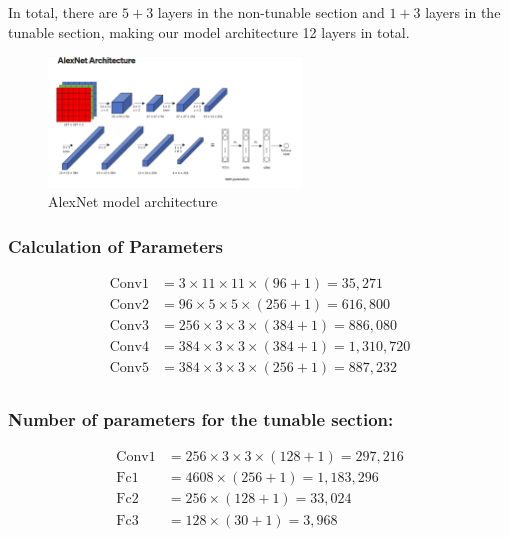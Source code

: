 \documentclass{article} %
\begin{document}
In total, there are $5+3$ layers in the non-tunable section and $1+3$ layers in the tunable section, making our model architecture 12 layers in total.
  
\begin{figure}[h]
    \begin{center}
    \includegraphics[width=0.6\textwidth]{figures/AlexNetStructure.png}
    \end{center}
    \caption{AlexNet model architecture \citep{Bangar.AlexNetArchitectureExplained.2022}}
\end{figure}

\subsubsection{Calculation of Parameters}

\begin{align*}
\text{Conv1} & = 3 \times 11 \times 11 \times (96 + 1) = 35,271 \\
\text{Conv2} & = 96 \times 5 \times 5 \times (256 + 1) = 616,800 \\
\text{Conv3} & = 256 \times 3 \times 3 \times (384 + 1) = 886,080 \\
\text{Conv4} & = 384 \times 3 \times 3 \times (384 + 1) = 1,310,720 \\
\text{Conv5} & = 384 \times 3 \times 3 \times (256 + 1) = 887,232 \\
\end{align*}

\subsubsection{Number of parameters for the tunable section:}
\begin{align*}
\text{Conv1} & = 256 \times 3 \times 3 \times (128 + 1) = 297,216 \\
\text{Fc1} & = 4608 \times (256 + 1) = 1,183,296 \\
\text{Fc2} & = 256 \times (128 + 1) = 33,024 \\
\text{Fc3} & = 128 \times (30 + 1) = 3,968 \\
\end{align*}
\end{document}
